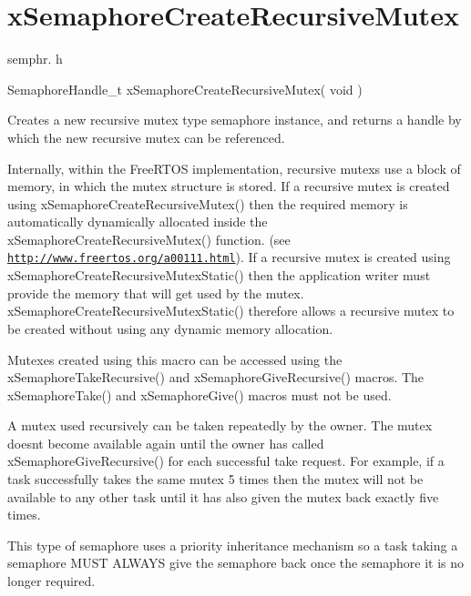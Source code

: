 \hypertarget{group__x_semaphore_create_recursive_mutex}{}\section{x\+Semaphore\+Create\+Recursive\+Mutex}
\label{group__x_semaphore_create_recursive_mutex}
semphr. h 
\begin{DoxyPre}SemaphoreHandle\_t xSemaphoreCreateRecursiveMutex( void )\end{DoxyPre}


Creates a new recursive mutex type semaphore instance, and returns a handle by which the new recursive mutex can be referenced.

Internally, within the Free\+R\+T\+OS implementation, recursive mutexs use a block of memory, in which the mutex structure is stored. If a recursive mutex is created using x\+Semaphore\+Create\+Recursive\+Mutex() then the required memory is automatically dynamically allocated inside the x\+Semaphore\+Create\+Recursive\+Mutex() function. (see \href{http://www.freertos.org/a00111.html}{\tt http\+://www.\+freertos.\+org/a00111.\+html}). If a recursive mutex is created using x\+Semaphore\+Create\+Recursive\+Mutex\+Static() then the application writer must provide the memory that will get used by the mutex. x\+Semaphore\+Create\+Recursive\+Mutex\+Static() therefore allows a recursive mutex to be created without using any dynamic memory allocation.

Mutexes created using this macro can be accessed using the x\+Semaphore\+Take\+Recursive() and x\+Semaphore\+Give\+Recursive() macros. The x\+Semaphore\+Take() and x\+Semaphore\+Give() macros must not be used.

A mutex used recursively can be \textquotesingle{}taken\textquotesingle{} repeatedly by the owner. The mutex doesn\textquotesingle{}t become available again until the owner has called x\+Semaphore\+Give\+Recursive() for each successful \textquotesingle{}take\textquotesingle{} request. For example, if a task successfully \textquotesingle{}takes\textquotesingle{} the same mutex 5 times then the mutex will not be available to any other task until it has also \textquotesingle{}given\textquotesingle{} the mutex back exactly five times.

This type of semaphore uses a priority inheritance mechanism so a task \textquotesingle{}taking\textquotesingle{} a semaphore M\+U\+ST A\+L\+W\+A\+YS \textquotesingle{}give\textquotesingle{} the semaphore back once the semaphore it is no longer required.

